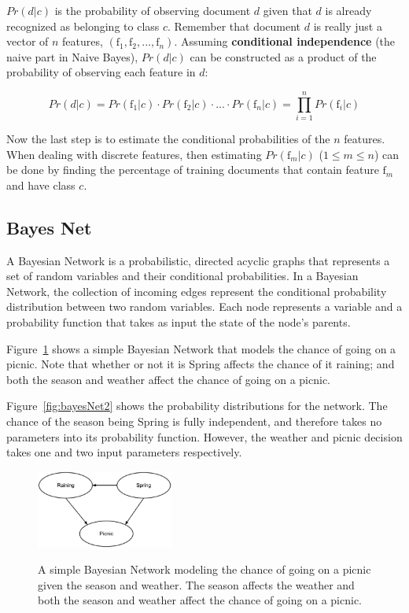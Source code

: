 \documentclass[12pt]{ucthesis}
\newcommand{\captionfonts}{\small\bf\ssp}
\begin{document}
$Pr(d|c)$ is the probability of observing document $d$ given that $d$ is already recognized as belonging to
class $c$. Remember that document $d$ is really just a vector of $n$ features, $(\textrm{f}_{1}, \textrm{f}_{2}, ..., \textrm{f}_{n})$.
Assuming \textbf{conditional independence} (the \textsf{naive} part in Naive Bayes), $Pr(d|c)$ can be
constructed as a product of the probability of observing each feature in $d$:

\begin{equation}
   Pr(d|c) = Pr(\textrm{f}_{1}|c) \cdot Pr(\textrm{f}_{2}|c) \cdot ... \cdot Pr(\textrm{f}_{n}|c) = \prod_{i = 1}^{n}Pr(\textrm{f}_{i}|c)
\end{equation}

Now the last step is to estimate the conditional probabilities of the $n$ features.
When dealing with discrete features, then estimating $Pr(\textrm{f}_{m}|c)$ ($1 \leq m \leq n$) can be done by
finding the percentage of training documents that contain feature $\textrm{f}_{m}$ and have class $c$.

\subsection{Bayes Net}
\label{background-classifiers-bayes-net}
A Bayesian Network is a probabilistic, directed acyclic graphs that represents a set of random variables and their conditional probabilities.
In a Bayesian Network, the collection of incoming edges represent the conditional probability distribution between two random variables.
Each node represents a variable and a probability function that takes as input the state of the node's parents.\cite{Pearl}\cite{Neapolitan}

Figure~\ref{fig:bayesNet1} shows a simple Bayesian Network that models the chance of going on a picnic.
Note that whether or not it is Spring affects the chance of it raining; and both the season and weather
affect the chance of going on a picnic.

Figure~\ref{fig:bayesNet2} shows the probability distributions for the network. The chance of the season being Spring is
fully independent, and therefore takes no parameters into its probability function. However, the weather and picnic decision
takes one and two input parameters respectively.

\begin{figure}
   \begin{center}
      \includegraphics[width=0.4\textwidth]{images/Bayes_Net_1.eps}
      \captionfonts
      \caption[Simple Bayes Net]{A simple Bayesian Network modeling the chance of going on a picnic given the season and weather. The season affects the weather and both the season and weather affect the chance of going on a picnic.}
      \label{fig:bayesNet1}
   \end{center}
\end{figure}
\end{document}

